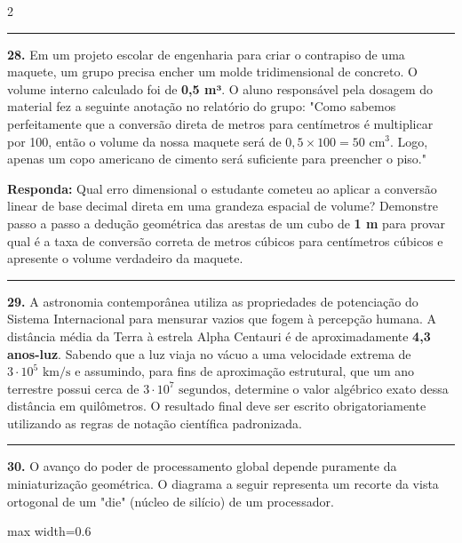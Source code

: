 \documentclass[twoside, 10pt, a4paper]{article}
\begin{document}
\begin{multicols*}{2}
\noindent\textcolor{CorLinha}{\rule{\linewidth}{0.5pt}} 
\par\par\vspace{0.5cm}
\textbf{28.} Em um projeto escolar de engenharia para criar o contrapiso de uma maquete, um grupo precisa encher um molde tridimensional de concreto. O volume interno calculado foi de \textbf{0,5 m³}. O aluno responsável pela dosagem do material fez a seguinte anotação no relatório do grupo:
"Como sabemos perfeitamente que a conversão direta de metros para centímetros é multiplicar por 100, então o volume da nossa maquete será de $0,5 \times 100 = 50 \text{ cm}^3$. Logo, apenas um copo americano de cimento será suficiente para preencher o piso."
\begin{boxresponda}
\textbf{Responda:} Qual erro dimensional o estudante cometeu ao aplicar a conversão linear de base decimal direta em uma grandeza espacial de volume? Demonstre passo a passo a dedução geométrica das arestas de um cubo de \textbf{1 m} para provar qual é a taxa de conversão correta de metros cúbicos para centímetros cúbicos e apresente o volume verdadeiro da maquete.
\end{boxresponda}
\par\vspace{0.5cm}

\noindent\textcolor{CorLinha}{\rule{\linewidth}{0.5pt}} 
\par\par\vspace{0.5cm}
\textbf{29.} A astronomia contemporânea utiliza as propriedades de potenciação do Sistema Internacional para mensurar vazios que fogem à percepção humana. A distância média da Terra à estrela Alpha Centauri é de aproximadamente \textbf{4,3 anos-luz}. Sabendo que a luz viaja no vácuo a uma velocidade extrema de $3 \cdot 10^5 \text{ km/s}$ e assumindo, para fins de aproximação estrutural, que um ano terrestre possui cerca de $3 \cdot 10^7 \text{ segundos}$, determine o valor algébrico exato dessa distância em quilômetros. O resultado final deve ser escrito obrigatoriamente utilizando as regras de notação científica padronizada.
\par\vspace{0.5cm}

\noindent\textcolor{CorLinha}{\rule{\linewidth}{0.5pt}} 
\par\par\vspace{0.5cm}
\textbf{30.} O avanço do poder de processamento global depende puramente da miniaturização geométrica. O diagrama a seguir representa um recorte da vista ortogonal de um "die" (núcleo de silício) de um processador.
\begin{center}
\begin{adjustbox}{max width=0.6\linewidth}
\end{adjustbox}
\end{center}
\end{multicols*}
\end{document}
